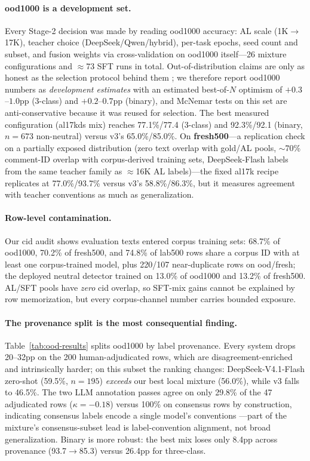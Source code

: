 \paragraph{ood1000 is a development set.} Every Stage-2 decision was made by
reading ood1000 accuracy: AL scale (1K$\to$17K), teacher choice
(DeepSeek/Qwen/hybrid), per-task epochs, seed count and subset, and fusion
weights via cross-validation on ood1000 itself---26 mixture configurations
and $\approx$73 SFT runs in total. Out-of-distribution claims are only as
honest as the selection protocol behind them \citep{baran2023ood}; we
therefore report ood1000 numbers as \emph{development estimates} with an
estimated best-of-$N$ optimism of
$+0.3$--$1.0$pp (3-class) and $+0.2$--$0.7$pp (binary), and McNemar tests
on this set are anti-conservative because it was reused for selection. The
best measured configuration (al17kds mix) reaches 77.1\%/77.4 (3-class)
and 92.3\%/92.1 (binary, $n{=}673$ non-neutral) versus v3's 65.0\%/85.0\%.
On \textbf{fresh500}---a replication check on a partially exposed
distribution (zero text overlap with gold/AL pools, $\sim$70\%
comment-ID overlap with corpus-derived training sets, DeepSeek-Flash
labels from the same teacher family as $\approx$16K AL labels)---the
fixed al17k recipe replicates at 77.0\%/93.7\% versus v3's 58.8\%/86.3\%,
but it measures agreement with teacher conventions as much as
generalization.

\paragraph{Row-level contamination.} Our cid audit shows evaluation texts
entered corpus training sets: 68.7\% of ood1000, 70.2\% of fresh500, and
74.8\% of lab500 rows share a corpus ID with at least one
corpus-trained model, plus 220/107 near-duplicate rows on ood/fresh; the
deployed neutral detector trained on 13.0\% of ood1000 and 13.2\% of
fresh500. AL/SFT pools have \emph{zero} cid overlap, so SFT-mix gains
cannot be explained by row memorization, but every corpus-channel number
carries bounded exposure.

\paragraph{The provenance split is the most consequential finding.}
Table~\ref{tab:ood-results} splits ood1000 by label provenance. Every
system drops 20--32pp on the 200 human-adjudicated rows, which are
disagreement-enriched and intrinsically harder; on this subset the
ranking changes: DeepSeek-V4.1-Flash zero-shot (59.5\%, $n{=}195$)
\emph{exceeds} our best local mixture (56.0\%), while v3 falls to
46.5\%. The two LLM annotation passes agree on only 29.8\% of the 47
adjudicated rows ($\kappa{=}{-}0.18$) versus 100\% on consensus rows by
construction, indicating consensus labels encode a single model's
conventions \citep{schroeder2025humanloop,moller2024parrot}---part of
the mixture's consensus-subset lead is label-convention alignment, not
broad generalization. Binary is more robust: the best mix loses only
8.4pp across provenance (93.7$\to$85.3) versus 26.4pp for three-class.

